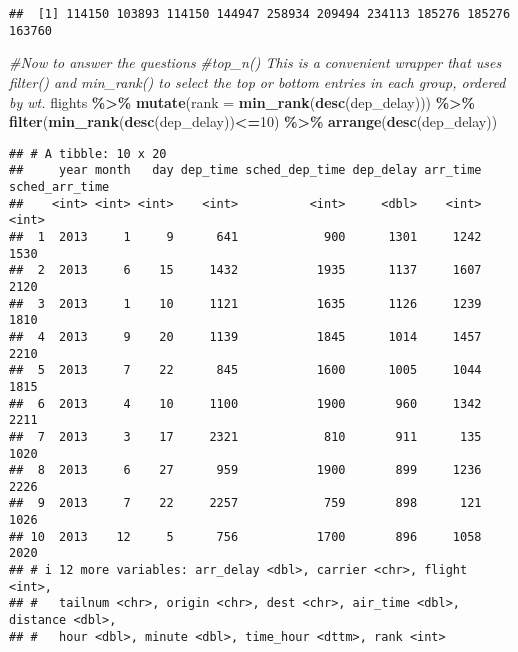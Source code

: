 \documentclass[
]{article}
\newenvironment{Shaded}{\begin{snugshade}}{\end{snugshade}}
\newcommand{\AttributeTok}[1]{\textcolor[rgb]{0.13,0.29,0.53}{#1}}
\newcommand{\CommentTok}[1]{\textcolor[rgb]{0.56,0.35,0.01}{\textit{#1}}}
\newcommand{\DecValTok}[1]{\textcolor[rgb]{0.00,0.00,0.81}{#1}}
\newcommand{\DocumentationTok}[1]{\textcolor[rgb]{0.56,0.35,0.01}{\textbf{\textit{#1}}}}
\newcommand{\FunctionTok}[1]{\textcolor[rgb]{0.13,0.29,0.53}{\textbf{#1}}}
\newcommand{\NormalTok}[1]{#1}
\newcommand{\SpecialCharTok}[1]{\textcolor[rgb]{0.81,0.36,0.00}{\textbf{#1}}}
\begin{document}
\begin{Shaded}
\end{Shaded}

\begin{verbatim}
##  [1] 114150 103893 114150 144947 258934 209494 234113 185276 185276 163760
\end{verbatim}

\begin{Shaded}
\begin{Highlighting}[]
\CommentTok{\#Now to answer the questions}
\CommentTok{\#top\_n() This is a convenient wrapper that uses filter() and min\_rank() to select the top or bottom entries in each group, ordered by wt.}
\NormalTok{flights }\SpecialCharTok{\%\textgreater{}\%} 
  \FunctionTok{mutate}\NormalTok{(}\AttributeTok{rank =} \FunctionTok{min\_rank}\NormalTok{(}\FunctionTok{desc}\NormalTok{(dep\_delay))) }\SpecialCharTok{\%\textgreater{}\%} 
  \FunctionTok{filter}\NormalTok{(}\FunctionTok{min\_rank}\NormalTok{(}\FunctionTok{desc}\NormalTok{(dep\_delay))}\SpecialCharTok{\textless{}=}\DecValTok{10}\NormalTok{) }\SpecialCharTok{\%\textgreater{}\%}
  \FunctionTok{arrange}\NormalTok{(}\FunctionTok{desc}\NormalTok{(dep\_delay))}
\end{Highlighting}
\end{Shaded}

\begin{verbatim}
## # A tibble: 10 x 20
##     year month   day dep_time sched_dep_time dep_delay arr_time sched_arr_time
##    <int> <int> <int>    <int>          <int>     <dbl>    <int>          <int>
##  1  2013     1     9      641            900      1301     1242           1530
##  2  2013     6    15     1432           1935      1137     1607           2120
##  3  2013     1    10     1121           1635      1126     1239           1810
##  4  2013     9    20     1139           1845      1014     1457           2210
##  5  2013     7    22      845           1600      1005     1044           1815
##  6  2013     4    10     1100           1900       960     1342           2211
##  7  2013     3    17     2321            810       911      135           1020
##  8  2013     6    27      959           1900       899     1236           2226
##  9  2013     7    22     2257            759       898      121           1026
## 10  2013    12     5      756           1700       896     1058           2020
## # i 12 more variables: arr_delay <dbl>, carrier <chr>, flight <int>,
## #   tailnum <chr>, origin <chr>, dest <chr>, air_time <dbl>, distance <dbl>,
## #   hour <dbl>, minute <dbl>, time_hour <dttm>, rank <int>
\end{verbatim}
\end{document}
